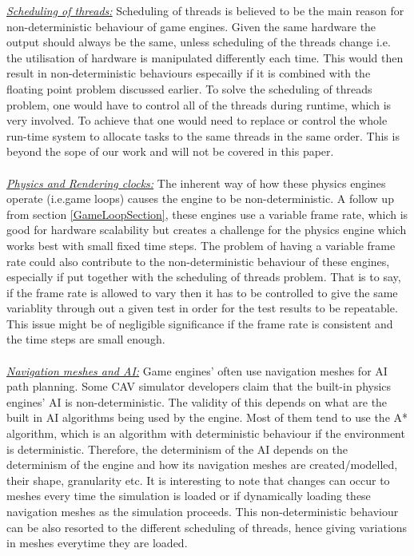 %
\noindent\underline{\textit{Scheduling of threads:}} Scheduling of threads is believed to be the main reason for non-deterministic behaviour of game engines. Given the same hardware the output should always be the same, unless scheduling of the threads change i.e. the utilisation of hardware is manipulated differently each time. This would then result in non-deterministic behaviours especailly if it is combined with the floating point problem discussed earlier. 
To solve the scheduling of threads problem, one would have to control all of the threads during runtime, which is very involved. To achieve that one would need to replace or control the whole run-time system to allocate tasks to the same threads in the same order. This is beyond the sope of our work and will not be covered in this paper.\\\\
%
\noindent\underline{\textit{Physics and Rendering clocks:}}
The inherent way of how these physics engines operate (i.e.game loops) causes the engine to be non-deterministic. 
A follow up from section \ref{GameLoopSection}, these engines use a variable frame rate, which is good for hardware scalability but creates a challenge for the physics engine which works best with small fixed time steps. 
The problem of having a variable frame rate could also contribute to the non-deterministic behaviour of these engines, especially if put together with the scheduling of threads problem. That is to say, if the frame rate is allowed to vary then it has to be controlled to give the same variablity through out a given test in order for the test results to be repeatable. This issue might be of negligible significance if the frame rate is consistent and the time steps are small enough. \\\\
%
\noindent\underline{\textit{Navigation meshes and AI:}}
Game engines' often use navigation meshes for AI path planning. Some CAV simulator developers claim that the built-in physics engines' AI is non-deterministic\cite{CARLABenchmark}. 
The validity of this depends on what are the built in AI algorithms being used by the engine. 
Most of them tend to use the A* algorithm\cite{AStarBook}, which is an algorithm with deterministic behaviour if the environment is deterministic\cite{AirsimUnrealArticle}\cite{UnrealAIDocumentation}. 
Therefore, the determinism of the AI depends on the determinism of the engine and how its navigation meshes are created/modelled, their shape, granularity etc. It is interesting to note that changes can occur to meshes every time the simulation is loaded or if dynamically loading these navigation meshes as the simulation proceeds. This non-deterministic behaviour can be also resorted to the different scheduling of threads, hence giving variations in meshes everytime they are loaded.


